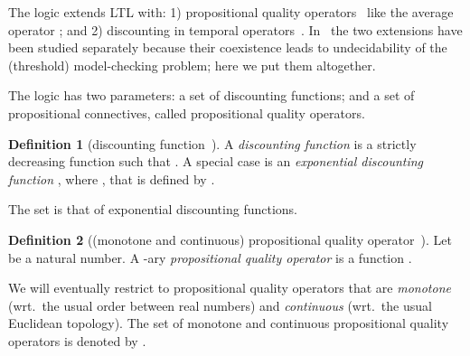 \documentclass[a4paper,USenglish,numberwithinsect]{lipics}
\newif\ifignore \ignorefalse
\newcommand{\auxproof}[1]{
\ifignore\mbox{}\newline
\textbf{BEGIN: AUX-PROOF} \dotfill\newline
{#1}\mbox{}\newline
\textbf{END: AUX-PROOF}\dotfill\newline
\fi}
\theoremstyle{definition}
\newtheorem{defi}{Definition}[section]
\theoremstyle{remark}
\newtheorem{rem}[defi]{Remark}
\theoremstyle{plain}
\begin{document}
The logic   extends LTL with: 1) 
propositional quality operators~\cite{AlmagorBK13} like the 
average operator ; and 2) discounting in temporal
operators~\cite{AlmagorBK14}. In~\cite{AlmagorBK14} the two extensions
have been studied separately because their coexistence leads to undecidability
of the (threshold) model-checking problem; here we put them altogether.

\auxproof{The logic is quantitative---a truth value is a
number in the unit interval  rather than a Boolean value from
. The logic features fixed point operators with
future discounting. 
}

 The logic  has two parameters: 
a set  of discounting
functions; and a set  of propositional connectives,
called propositional quality operators. 
\begin{defi}[discounting function~\cite{AlmagorBK14}]\label{def:discountFunction}
 A \emph{discounting function} is a strictly decreasing function  such that . A
 special case is an \emph{exponential discounting function}
 , where , that is defined by
 . 

 The set
 is that of exponential discounting
 functions.
\end{defi}

\auxproof{
\begin{rem}An extension of the framework is proposed in~\cite{AlmagorBK14} where a discounting functions  need
 not tend to . It is claimed that
 such an extension, e.g.\ when  tends to , is suited for
 the situation where we are (not totally pessimistic but) ambivalent
 about the future. This extension does not change the algorithmic
 results in~\cite{AlmagorBK14}, nor here. It is
 enough that the limit value  is statically known so that
 we can use the value in construction of automata.
\end{rem}
}



\begin{defi}[(monotone and continuous) propositional quality
 operator~\cite{AlmagorBK13}]\label{def:propositionalQualityOperator}
 Let  be a natural number.
 A -ary \emph{propositional quality operator} is a 
 function
 . 

 We will eventually restrict to  propositional quality operators that are 
 \emph{monotone} (wrt.\ the usual order between real numbers)
 and \emph{continuous} (wrt.\ the usual Euclidean topology). 
 The set of monotone and continuous propositional quality operators
is denoted by .
\end{defi}
\end{document}
